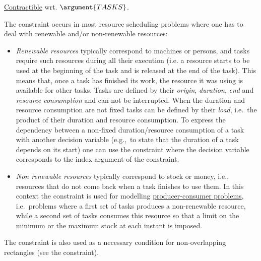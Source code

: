 \begin{ctrdesc}
{\begin{minipage}[t]{11.2cm}
\end{minipage}}
\item[\pdfmarkup{subject={Arg. properties},color=white,markup=Highlight}{Arg. properties}{Properties of some arguments of the constraint (e.g. Functional dependency: an argument is determined by some other arguments, Contractibility: can remove items from any position of a collection, Prefix-contractibility: can remove items from first position, Suffix-contractibility: can remove items from last position, Extensibility: can add items at any position of a collection, Prefix-extensibility: can add items before first position, Suffix-extensibility: can add items after last position).}]
\colorbox{MyAzurelight}{\begin{minipage}[t]{11.2cm}
\hyperlink{contractible}{Contractible} wrt. $\argument{TASKS}$.
\end{minipage}}
\item[\pdfmarkup{subject={Usage},color=white,markup=Highlight}{Usage}{Typical usage of the constraint.}]
The  constraint occurs in most resource scheduling problems
where one has to deal with renewable and/or non-renewable resources:
\begin{itemize}
\item
\emph{Renewable resources} typically correspond to machines or persons, and tasks require
such resources during all their execution (i.e. a resource starts to be used at the beginning
of the task and is released at the end of the task). This means that, once a task has finished
its work, the resource it was using is available for other tasks.
Tasks are defined by their
\emph{origin}, \emph{duration}, \emph{end} and \emph{resource consumption}
and can not be interrupted. When the duration and resource consumption are not fixed
tasks can be defined by their \emph{load}, i.e.~the product of their duration and resource
consumption. To express the dependency between a non-fixed duration/resource consumption
of a task with another decision variable (e.g.,~to state that the duration of a task depends on its start)
one can use the \hyperlink{Celement}{} constraint where the decision variable
corresponds to the index argument of the \hyperlink{Celement}{} constraint.
\item
\emph{Non renewable resources} typically correspond to stock or money, i.e., resources
that do not come back when a task finishes to use them. In this context the
 constraint is used for modelling
\hyperlink{producer-consumer}{producer-consumer problems},
i.e.~problems where a first set of tasks produces a non\nobreakdash-renewable resource,
while a second set of tasks consumes this resource so that a limit
on the minimum or the maximum stock at each instant is imposed.
\end{itemize}
The  constraint is also used as a necessary condition for non-overlapping
rectangles (see the \hyperlink{Cdiffn}{} constraint).


\end{ctrdesc}
